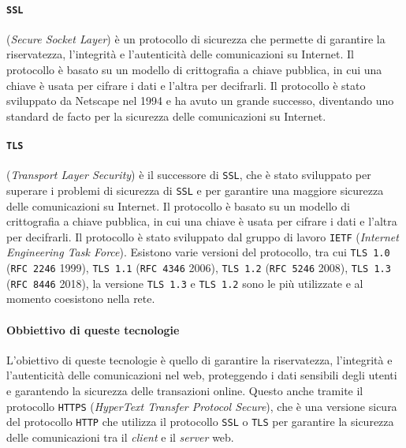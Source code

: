     \paragraph{\texttt{SSL}} (\textit{Secure Socket Layer}) è un protocollo di sicurezza che permette di garantire la riservatezza, l'integrità e l'autenticità delle comunicazioni su Internet. Il protocollo è basato su un modello di crittografia a chiave pubblica, in cui una chiave è usata per cifrare i dati e l'altra per decifrarli. Il protocollo è stato sviluppato da Netscape nel 1994 e ha avuto un grande successo, diventando uno standard de facto per la sicurezza delle comunicazioni su Internet.
    \paragraph{\texttt{TLS}} (\textit{Transport Layer Security}) è il successore di \texttt{SSL}, che è stato sviluppato per superare i problemi di sicurezza di \texttt{SSL} e per garantire una maggiore sicurezza delle comunicazioni su Internet. Il protocollo è basato su un modello di crittografia a chiave pubblica, in cui una chiave è usata per cifrare i dati e l'altra per decifrarli. Il protocollo è stato sviluppato dal gruppo di lavoro \texttt{IETF} (\textit{Internet Engineering Task Force}). Esistono varie versioni del protocollo, tra cui \texttt{TLS 1.0} (\texttt{RFC 2246} 1999), \texttt{TLS 1.1} (\texttt{RFC 4346} 2006), \texttt{TLS 1.2} (\texttt{RFC 5246} 2008), \texttt{TLS 1.3} (\texttt{RFC 8446} 2018), la versione \texttt{TLS 1.3} e \texttt{TLS 1.2} sono le più utilizzate e al momento coesistono nella rete.
    \paragraph{Obbiettivo di queste tecnologie} L'obiettivo di queste tecnologie è quello di garantire la riservatezza, l'integrità e l'autenticità delle comunicazioni nel web, proteggendo i dati sensibili degli utenti e garantendo la sicurezza delle transazioni online. Questo anche tramite il protocollo \texttt{HTTPS} (\textit{HyperText Transfer Protocol Secure}), che è una versione sicura del protocollo \texttt{HTTP} che utilizza il protocollo \texttt{SSL} o \texttt{TLS} per garantire la sicurezza delle comunicazioni tra il \textit{client} e il \textit{server} web.
